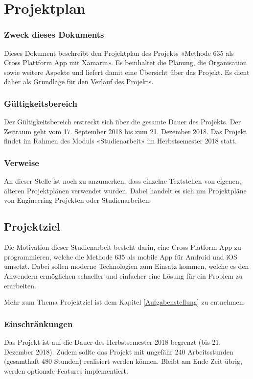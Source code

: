 \section{Projektplan}

\subsubsection*{Zweck dieses Dokuments}
Dieses Dokument beschreibt den Projektplan des Projekts «Methode 635 als Cross Plattform App mit Xamarin». Es beinhaltet die Planung, die Organisation sowie weitere Aspekte und liefert damit eine Übersicht über das Projekt. Es dient daher als Grundlage für den Verlauf des Projekts.

\subsubsection*{Gültigkeitsbereich}
Der Gültigkeitsbereich erstreckt sich über die gesamte Dauer des Projekts. Der Zeitraum geht vom 17. September 2018 bis zum 21. Dezember 2018. Das Projekt findet im Rahmen des Moduls «Studienarbeit» im Herbstsemester 2018 statt.

\subsubsection*{Verweise}
An dieser Stelle ist noch zu anzumerken, dass einzelne Textstellen von eigenen, älteren Projektplänen verwendet wurden. Dabei handelt es sich um Projektpläne von Engineering-Projekten oder Studienarbeiten.

\subsection{Projektziel}
Die Motivation dieser Studienarbeit besteht darin, eine Cross-Platform App zu programmieren, welche die Methode 635 \cite{methode-635} als mobile App für Android und iOS umsetzt. Dabei sollen moderne Technologien zum Einsatz kommen, welche es den Anwendern ermöglichen schneller und einfacher eine Lösung für ein Problem zu erarbeiten.


Mehr zum Thema Projektziel ist dem Kapitel \ref{Aufgabenstellung} zu entnehmen.

\subsubsection*{Einschränkungen}
Das Projekt ist auf die Dauer des Herbstsemester 2018 begrenzt (bis 21. Dezember 2018). Zudem sollte das Projekt mit ungefähr 240 Arbeitsstunden (gesamthaft 480 Stunden) realisiert werden können. Bleibt am Ende Zeit übrig, werden optionale Features implementiert.

